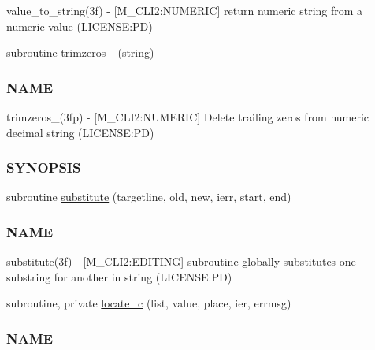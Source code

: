 \begin{DoxyCompactItemize}
\begin{DoxyCompactList}
value\+\_\+to\+\_\+string(3f) -\/ \mbox{[}M\+\_\+\+C\+L\+I2\+:N\+U\+M\+E\+R\+IC\mbox{]} return numeric string from a numeric value (L\+I\+C\+E\+N\+SE\+:PD) \end{DoxyCompactList}\item 
subroutine \mbox{\hyperlink{namespacem__cli2_a770a66475094fd80493d46498de1ebf7}{trimzeros\+\_\+}} (string)
\begin{DoxyCompactList}\small\item\em \subsubsection*{N\+A\+ME}

trimzeros\+\_\+(3fp) -\/ \mbox{[}M\+\_\+\+C\+L\+I2\+:N\+U\+M\+E\+R\+IC\mbox{]} Delete trailing zeros from numeric decimal string (L\+I\+C\+E\+N\+SE\+:PD) \subsubsection*{S\+Y\+N\+O\+P\+S\+IS}\end{DoxyCompactList}\item 
subroutine \mbox{\hyperlink{namespacem__cli2_a76af7f7c39e6755e024890d85d488704}{substitute}} (targetline, old, new, ierr, start, end)
\begin{DoxyCompactList}\small\item\em \subsubsection*{N\+A\+ME}

substitute(3f) -\/ \mbox{[}M\+\_\+\+C\+L\+I2\+:E\+D\+I\+T\+I\+NG\mbox{]} subroutine globally substitutes one substring for another in string (L\+I\+C\+E\+N\+SE\+:PD) \end{DoxyCompactList}\item 
subroutine, private \mbox{\hyperlink{namespacem__cli2_a2199778fea512efcde8778f20765643a}{locate\+\_\+c}} (list, value, place, ier, errmsg)
\begin{DoxyCompactList}\small\item\em \subsubsection*{N\+A\+ME}


\end{DoxyCompactList}
\end{DoxyCompactItemize}
